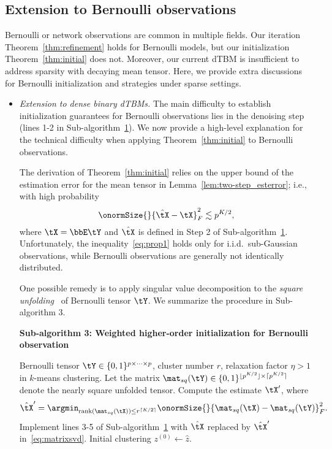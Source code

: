 \documentclass[lettersize,onecolumn,journal]{IEEEtran}
\theoremstyle{definition}
\theoremstyle{definition}
\DeclarePairedDelimiter{\ceil}{\lceil}{\rceil}
\DeclarePairedDelimiter{\floor}{\lfloor}{\rfloor}
\begin{document}
{
\color{blue}

\subsection{Extension to Bernoulli observations}\label{subsec:ber}

Bernoulli or network observations are common in multiple fields. Our iteration Theorem~\ref{thm:refinement} holds for Bernoulli models, but our initialization Theorem~\ref{thm:initial} does not. Moreover, our current dTBM is insufficient to address sparsity with decaying mean tensor. Here, we provide extra discussions for Bernoulli initialization and strategies under sparse settings.

\begin{itemize}[wide]
    \item \textit{Extension to dense binary dTBMs.} The main difficulty to establish initialization guarantees for Bernoulli observations lies in the denoising step (lines 1-2 in Sub-algorithm~\hyperref[alg:main]{1}). We now provide a high-level explanation for the technical difficulty when applying Theorem~\ref{thm:initial} to Bernoulli observations. 
    
    
    The derivation of Theorem~\ref{thm:initial} relies on the upper bound of the estimation error for the mean tensor in Lemma~\ref{lem:two-step_esterror}; i.e., with high probability
\begin{equation}\label{eq:prop1}
    \onormSize{}{\hat \tX - \tX}_F^2 \lesssim p^{K/2},
\end{equation}
where $\tX = \bbE\tY$ and $\hat \tX$ is defined in Step 2 of Sub-algorithm~\hyperref[alg:main]{1}. Unfortunately, the inequality~\eqref{eq:prop1} holds only for i.i.d.\ sub-Gaussian observations, while Bernoulli observations are generally not identically distributed.  

One possible remedy is to apply singular value decomposition to the \emph{square unfolding}~\citep{mu2014square} of Bernoulli tensor $\tY$. We summarize the procedure in Sub-algorithm 3.

\begin{algorithm}[h!]
\caption*{\bf Sub-algorithm 3: Weighted higher-order initialization for Bernoulli observation}
\vspace{.15cm}
\begin{algorithmic}[1] 
\INPUT Bernoulli tensor $\tY \in \{0,1\}^{p\times \cdots \times p}$, cluster number $r$, relaxation factor $\eta > 1$ in $k$-means clustering.
\State  Let the matrix $\mat_{sq} (\tY) \in \{0,1\}^{\floor{p^{K/2}} \times \ceil{p^{K/2}} }$ denote the nearly square unfolded tensor. Compute the estimate $\tX'$, where
\begin{equation}\label{eq:matrixsvd}
    \hat \tX' = \argmin_{\text{rank}(\mat_{sq}(\tX)) \leq r^{\ceil{K/2}}} \onormSize{}{ \mat_{sq}(\tX) -  \mat_{sq}(\tY)}_F^2.
\end{equation}
\State Implement lines 3-5 of Sub-algorithm~\hyperref[alg:main]{1} with $\hat \tX$ replaced by $\hat \tX'$ in~\eqref{eq:matrixsvd}.
\OUTPUT Initial clustering $z^{(0)} \leftarrow \hat z$.
\end{algorithmic}
\end{algorithm}


\end{itemize}}
\end{document}
